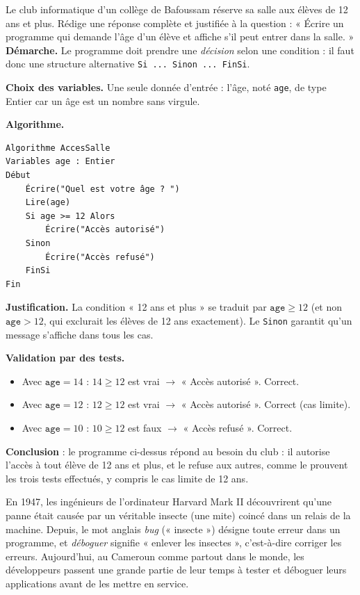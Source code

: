 \documentclass[11pt]{article}
\newcommand{\cle}[1]{{\popxbold\color{popdark}#1}}
\begin{document}
\begin{exoresolu}
Le club informatique d'un collège de Bafoussam réserve sa salle aux élèves de 12 ans et plus. Rédige une réponse complète et justifiée à la question : « Écrire un programme qui demande l'âge d'un élève et affiche s'il peut entrer dans la salle. »
\tcblower
\textbf{Démarche.} Le programme doit prendre une \emph{décision} selon une condition : il faut donc une structure alternative \texttt{Si ... Sinon ... FinSi}.

\textbf{Choix des variables.} Une seule donnée d'entrée : l'âge, noté \texttt{age}, de type \cle{Entier} car un âge est un nombre sans virgule.

\textbf{Algorithme.}
\begin{lstlisting}
Algorithme AccesSalle
Variables age : Entier
Début
    Écrire("Quel est votre âge ? ")
    Lire(age)
    Si age >= 12 Alors
        Écrire("Accès autorisé")
    Sinon
        Écrire("Accès refusé")
    FinSi
Fin
\end{lstlisting}
\textbf{Justification.} La condition « 12 ans et plus » se traduit par $\texttt{age} \geq 12$ (et non $\texttt{age} > 12$, qui exclurait les élèves de 12 ans exactement). Le \texttt{Sinon} garantit qu'un message s'affiche dans tous les cas.

\textbf{Validation par des tests.}
\begin{itemize}
\item Avec $\texttt{age} = 14$ : $14 \geq 12$ est vrai $\rightarrow$ « Accès autorisé ». Correct.
\item Avec $\texttt{age} = 12$ : $12 \geq 12$ est vrai $\rightarrow$ « Accès autorisé ». Correct (cas limite).
\item Avec $\texttt{age} = 10$ : $10 \geq 12$ est faux $\rightarrow$ « Accès refusé ». Correct.
\end{itemize}
\textbf{Conclusion} : le programme ci-dessus répond au besoin du club : il autorise l'accès à tout élève de 12 ans et plus, et le refuse aux autres, comme le prouvent les trois tests effectués, y compris le cas limite de 12 ans.
\end{exoresolu}

\begin{savaistu}
En 1947, les ingénieurs de l'ordinateur Harvard Mark II découvrirent qu'une panne était causée par un véritable insecte (une mite) coincé dans un relais de la machine. Depuis, le mot anglais \emph{bug} (« insecte ») désigne toute erreur dans un programme, et \emph{déboguer} signifie « enlever les insectes », c'est-à-dire corriger les erreurs. Aujourd'hui, au Cameroun comme partout dans le monde, les développeurs passent une grande partie de leur temps à tester et déboguer leurs applications avant de les mettre en service.
\end{savaistu}
\end{document}
